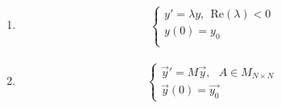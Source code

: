 \begin{ejemplo} \
\begin{enumerate}
    \item 
    \begin{align*}
            \left\{ \begin{array}{lcc}
             y' = \lambda y, \ \ \text{Re}(\lambda) < 0\\
             y(0) = y_0 \\
             \end{array}
   \right.
    \end{align*}
    \item
    \begin{align*}
        \left\{ \begin{array}{lcc}
             \overrightarrow{y}' = M\overrightarrow{y}, \ \ \ A \in M_{N \times N}\\
             \overrightarrow{y}(0) = \overrightarrow{y_0} 
             \end{array}
   \right.
    \end{align*}
\end{enumerate}
\end{ejemplo}

